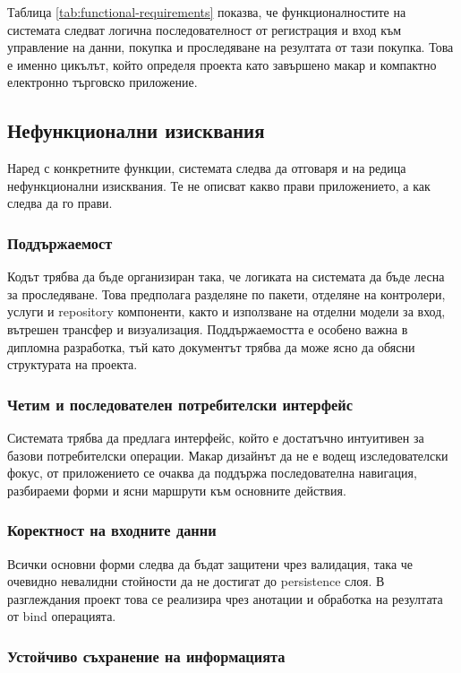 Таблица \ref{tab:functional-requirements} показва, че функционалностите на системата следват логична последователност от регистрация и вход към управление на данни, покупка и проследяване на резултата от тази покупка. Това е именно цикълът, който определя проекта като завършено макар и компактно електронно търговско приложение.

\subsection{Нефункционални изисквания}

Наред с конкретните функции, системата следва да отговаря и на редица нефункционални изисквания. Те не описват какво прави приложението, а как следва да го прави.

\subsubsection{Поддържаемост}

Кодът трябва да бъде организиран така, че логиката на системата да бъде лесна за проследяване. Това предполага разделяне по пакети, отделяне на контролери, услуги и repository компоненти, както и използване на отделни модели за вход, вътрешен трансфер и визуализация. Поддържаемостта е особено важна в дипломна разработка, тъй като документът трябва да може ясно да обясни структурата на проекта.

\subsubsection{Четим и последователен потребителски интерфейс}

Системата трябва да предлага интерфейс, който е достатъчно интуитивен за базови потребителски операции. Макар дизайнът да не е водещ изследователски фокус, от приложението се очаква да поддържа последователна навигация, разбираеми форми и ясни маршрути към основните действия.

\subsubsection{Коректност на входните данни}

Всички основни форми следва да бъдат защитени чрез валидация, така че очевидно невалидни стойности да не достигат до persistence слоя. В разглеждания проект това се реализира чрез анотации и обработка на резултата от bind операцията.

\subsubsection{Устойчиво съхранение на информацията}

